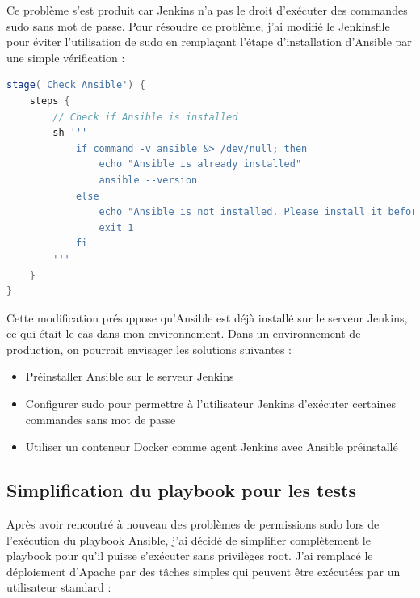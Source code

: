 \documentclass{article}
\begin{document}
Ce problème s'est produit car Jenkins n'a pas le droit d'exécuter des commandes sudo sans mot de passe. Pour résoudre ce problème, j'ai modifié le Jenkinsfile pour éviter l'utilisation de sudo en remplaçant l'étape d'installation d'Ansible par une simple vérification :

\begin{lstlisting}[language=groovy]
stage('Check Ansible') {
    steps {
        // Check if Ansible is installed
        sh '''
            if command -v ansible &> /dev/null; then
                echo "Ansible is already installed"
                ansible --version
            else
                echo "Ansible is not installed. Please install it before running this pipeline."
                exit 1
            fi
        '''
    }
}
\end{lstlisting}

Cette modification présuppose qu'Ansible est déjà installé sur le serveur Jenkins, ce qui était le cas dans mon environnement. Dans un environnement de production, on pourrait envisager les solutions suivantes :

\begin{itemize}
    \item Préinstaller Ansible sur le serveur Jenkins
    \item Configurer sudo pour permettre à l'utilisateur Jenkins d'exécuter certaines commandes sans mot de passe
    \item Utiliser un conteneur Docker comme agent Jenkins avec Ansible préinstallé
\end{itemize}

\subsection{Simplification du playbook pour les tests}

Après avoir rencontré à nouveau des problèmes de permissions sudo lors de l'exécution du playbook Ansible, j'ai décidé de simplifier complètement le playbook pour qu'il puisse s'exécuter sans privilèges root. J'ai remplacé le déploiement d'Apache par des tâches simples qui peuvent être exécutées par un utilisateur standard :
\end{document}
